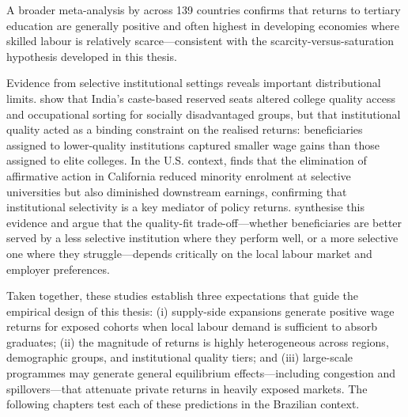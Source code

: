 A broader meta-analysis by  across 139 countries confirms that returns to tertiary education are generally positive and often highest in developing economies where skilled labour is relatively scarce---consistent with the scarcity-versus-saturation hypothesis developed in this thesis.

Evidence from selective institutional settings reveals important distributional limits.  show that India's caste-based reserved seats altered college quality access and occupational sorting for socially disadvantaged groups, but that institutional quality acted as a binding constraint on the realised returns: beneficiaries assigned to lower-quality institutions captured smaller wage gains than those assigned to elite colleges. In the U.S. context,  finds that the elimination of affirmative action in California reduced minority enrolment at selective universities but also diminished downstream earnings, confirming that institutional selectivity is a key mediator of policy returns.  synthesise this evidence and argue that the quality-fit trade-off---whether beneficiaries are better served by a less selective institution where they perform well, or a more selective one where they struggle---depends critically on the local labour market and employer preferences.

Taken together, these studies establish three expectations that guide the empirical design of this thesis: (i) supply-side expansions generate positive wage returns for exposed cohorts when local labour demand is sufficient to absorb graduates; (ii) the magnitude of returns is highly heterogeneous across regions, demographic groups, and institutional quality tiers; and (iii) large-scale programmes may generate general equilibrium effects---including congestion and spillovers---that attenuate private returns in heavily exposed markets. The following chapters test each of these predictions in the Brazilian context.
